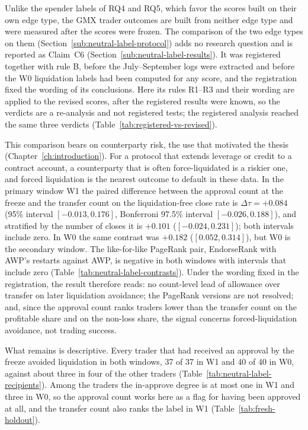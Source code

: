 Unlike the spender labels of RQ4 and RQ5, which favor the scores built on their own edge type, the GMX trader outcomes are built from neither edge type and were measured after the scores were frozen. The comparison of the two edge types on them (Section~\ref{sub:neutral-label-protocol}) adds no research question and is reported as Claim~C6 (Section~\ref{sub:neutral-label-results}). It was registered together with rule B, before the July--September logs were extracted and before the W0 liquidation labels had been computed for any score, and the registration fixed the wording of its conclusions. Here its rules R1--R3 and their wording are applied to the revised scores, after the registered results were known, so the verdicts are a re-analysis and not registered tests; the registered analysis reached the same three verdicts (Table~\ref{tab:registered-vs-revised}).

This comparison bears on counterparty risk, the use that motivated the thesis (Chapter~\ref{ch:introduction}). For a protocol that extends leverage or credit to a contract account, a counterparty that is often force-liquidated is a riskier one, and forced liquidation is the nearest outcome to default in these data. In the primary window W1 the paired difference between the approval count at the freeze and the transfer count on the liquidation-free close rate is $\Delta\tau=+0.084$ (95\% interval $[-0.013,0.176]$, Bonferroni 97.5\% interval $[-0.026,0.188]$), and stratified by the number of closes it is $+0.101$ ($[-0.024,0.231]$); both intervals include zero. In W0 the same contrast was $+0.182$ ($[0.052,0.314]$), but W0 is the secondary window. The like-for-like PageRank pair, EndorseRank with AWP's restarts against AWP, is negative in both windows with intervals that include zero (Table~\ref{tab:neutral-label-contrasts}). Under the wording fixed in the registration, the result therefore reads: no count-level lead of allowance over transfer on later liquidation avoidance; the PageRank versions are not resolved; and, since the approval count ranks traders lower than the transfer count on the profitable share and on the non-loss share, the signal concerns forced-liquidation avoidance, not trading success.

What remains is descriptive. Every trader that had received an approval by the freeze avoided liquidation in both windows, 37 of 37 in W1 and 40 of 40 in W0, against about three in four of the other traders (Table~\ref{tab:neutral-label-recipients}). Among the traders the in-approve degree is at most one in W1 and three in W0, so the approval count works here as a flag for having been approved at all, and the transfer count also ranks the label in W1 (Table~\ref{tab:fresh-holdout}).

